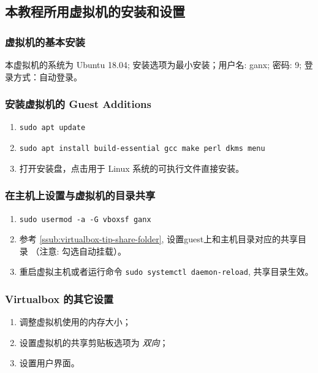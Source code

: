 \documentclass[cn,11pt, simple]{elegantbook}
\begin{document}
\subsection{本教程所用虚拟机的安装和设置}%
\label{sub:virtualbox-guest-settings}

\subsubsection{虚拟机的基本安装}%
\label{ssub:linux-ubuntu}

本虚拟机的系统为 Ubuntu 18.04; 安装选项为最小安装；用户名: ganx; 密码: 9;
登录方式：自动登录。

\subsubsection{安装虚拟机的 Guest Additions}%
\label{ssub:virtualbox-guest-additions}
\begin{enumerate}
    \item \lstinline{sudo apt update}
    \item \lstinline{sudo apt install build-essential gcc make perl dkms menu}
    \item 打开安装盘，点击用于 Linux 系统的可执行文件直接安装。
\end{enumerate}

\subsubsection{在主机上设置与虚拟机的目录共享}%
\label{ssub:vitualbox-shared-folder}
\begin{enumerate}
    \item \lstinline{sudo usermod -a -G vboxsf ganx}
    \item 参考 \ref{ssub:virtualbox-tip-share-folder},
        设置guest上和主机目录对应的共享目录 （注意: 勾选自动挂载）。
    \item 重启虚拟主机或者运行命令 \lstinline{sudo systemctl daemon-reload},
        共享目录生效。
\end{enumerate}

\subsubsection{Virtualbox 的其它设置}%
\label{ssub:virtualbox-others}
\begin{enumerate}
    \item 调整虚拟机使用的内存大小；
    \item 设置虚拟机的共享剪贴板选项为 \emph{双向}；
    \item 设置用户界面。
\end{enumerate}
\end{document}
